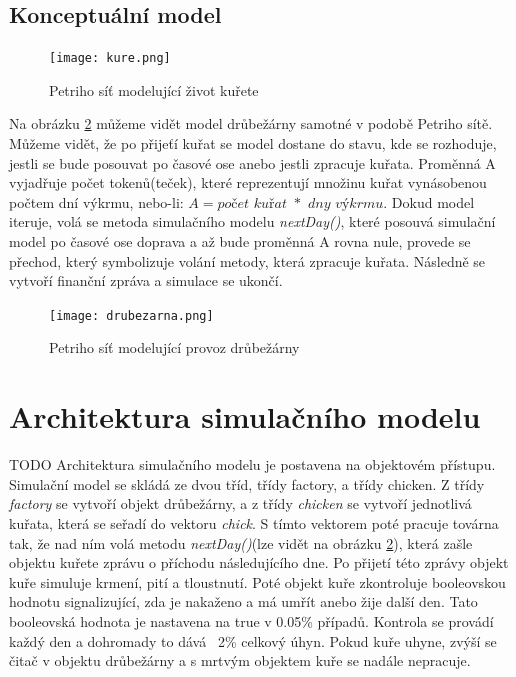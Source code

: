 \documentclass[a4paper,10pt]{article}
\begin{document}
\subsection{Konceptuální model}
\begin{figure}[h]
\caption{Petriho síť modelující život kuřete}
\texttt{[image: kure.png]}
\label{obr:petri_kure}
\end{figure}

Na obrázku \ref{obr:drubezarna} můžeme vidět model drůbežárny samotné v podobě Petriho sítě. Můžeme vidět, že po přijeťí kuřat
se model dostane do stavu, kde se rozhoduje, jestli se bude posouvat po časové ose anebo jestli zpracuje
kuřata. Proměnná A vyjadřuje počet tokenů(teček), které reprezentují množinu kuřat vynásobenou počtem dní výkrmu,
nebo-li: 
$A=\textit{počet kuřat }*\textit{ dny výkrmu}$.
Dokud model iteruje, volá se metoda simulačního modelu \textit{nextDay()}, které posouvá simulační model po časové ose doprava
a až bude proměnná A rovna nule, provede se přechod, který symbolizuje volání metody, která zpracuje kuřata. Následně 
se vytvoří finanční zpráva a simulace se ukončí.


\begin{figure}[h]
\caption{Petriho síť modelující provoz drůbežárny}
\texttt{[image: drubezarna.png]}
\label{obr:drubezarna}
\end{figure}

\pagebreak

\section{Architektura simulačního modelu}\label{architektura}
TODO\newline
Architektura simulačního modelu je postavena na objektovém přístupu. Simulační model se skládá ze dvou tříd,
třídy factory, a třídy chicken. Z třídy \textit{factory} se vytvoří objekt drůbežárny, a z třídy \textit{chicken}
se vytvoří jednotlivá kuřata, která se seřadí do vektoru \textit{chick}. S tímto vektorem poté pracuje továrna tak,
že nad ním volá metodu \textit{nextDay()}(lze vidět na obrázku \ref{obr:drubezarna}), která zašle objektu kuřete
zprávu o příchodu následujícího dne. Po přijetí této zprávy objekt kuře simuluje krmení, pití a tloustnutí.
Poté objekt kuře zkontroluje booleovskou hodnotu signalizující, zda je nakaženo a má umřít anebo žije další den.
Tato booleovská hodnota je nastavena na true v 0.05\% případů. Kontrola se provádí každý den a dohromady to dává ~2\% celkový úhyn.
Pokud kuře uhyne, zvýší se čitač v objektu drůbežárny a s mrtvým objektem kuře se nadále nepracuje.
\end{document}
